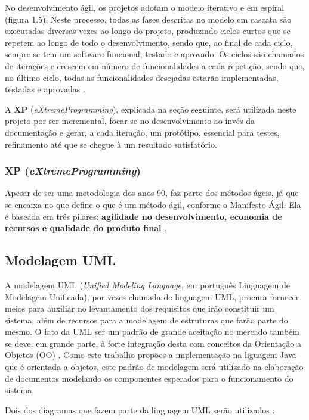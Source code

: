 No desenvolvimento ágil, os projetos adotam o modelo iterativo e em espiral (figura 1.5). Neste processo, todas as fases descritas no modelo em cascata são executadas diversas vezes ao longo do projeto, produzindo ciclos curtos que se repetem ao longo de todo o desenvolvimento, sendo que, ao final de cada ciclo, sempre se tem um software funcional, testado e aprovado. Os ciclos são chamados de iterações e crescem em número de funcionalidades a cada repetição, sendo que, no último ciclo, todas as funcionalidades desejadas estarão implementadas, testadas e aprovadas \cite{dev-agil2}.

A \textbf{XP} (\textit{eXtremeProgramming}), explicada na seção seguinte, será utilizada neste projeto por ser incremental, focar-se no desenvolvimento ao invés da documentação e gerar, a cada iteração, um protótipo, essencial para testes, refinamento até que se chegue à um resultado satisfatório.

\subsubsection{XP (\textit{eXtremeProgramming})}

Apesar de ser uma metodologia dos anos 90, faz parte dos métodos ágeis, já que se encaixa no que define o que é um método ágil, conforme o Manifesto Ágil. Ela é baseada em três pilares: \textbf{agilidade no desenvolvimento, economia de recursos e qualidade do produto final} \cite{dev-agil2}.

\subsection{Modelagem UML}

A modelagem UML (\textit{Unified Modeling Language}, em português Linguagem de Modelagem Unificada), por vezes chamada de linguagem UML, procura fornecer meios para auxiliar no levantamento dos requisitos que irão constituir um sistema, além de recursos para a modelagem de estruturas que farão parte do mesmo. O fato da UML ser um padrão de grande aceitação no mercado também se deve, em grande parte, à forte integração desta com conceitos da Orientação a Objetos (OO) \cite{uml}. Como este trabalho propões a implementação na liguagem Java que é orientada a objetos, este padrão de modelagem será utilizado na elaboração de documentos modelando os componentes esperados para o funcionamento do sistema.

Dois dos diagramas que fazem parte da linguagem UML serão utilizados \cite{uml}:

